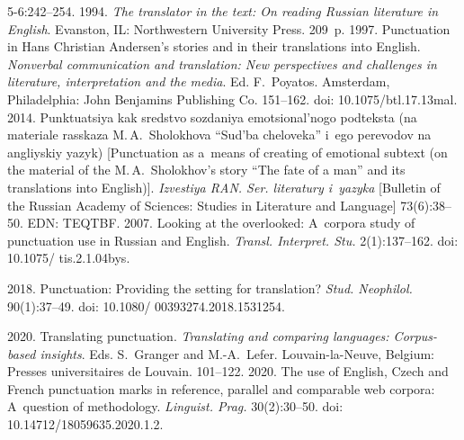 \begin{multicols}{2}
{{\begin{thebibliography}{99}
5-6:242--254.
 1994. \textit{The translator in the text: On reading Russian 
literature in English}. Evanston, IL: Northwestern University Press. 209~p.
 1997. Punctuation in Hans Christian Andersen's stories 
and in their translations into English. \textit{Nonverbal communication and 
translation: New perspectives and challenges in literature, interpretation and 
the media}. Ed. F.~Poyatos. Amsterdam, Philadelphia: John Benjamins Publishing 
Co. 151--162. doi: 10.1075/btl.17.13mal.
 2014. Punktuatsiya kak sredstvo so\-zda\-niya 
emotsional'nogo podteksta (na materiale rasskaza M.\,A.~Sho\-lo\-kho\-va 
``Sud'ba cheloveka'' i~ego perevodov na angliyskiy yazyk) [Punctuation as 
a~means of creating of emotional subtext (on the material of the 
M.\,A.~Sholokhov's story ``The fate of a man'' and its translations into 
English)]. \textit{Izvestiya RAN. Ser. literatury i~yazy\-ka} [Bulletin of the 
Russian Academy of Sciences: Studies in Literature and Language] 73(6):38--50. 
EDN: TEQTBF.
 2007. Looking at the overlooked: A~corpora study 
of punctuation use in Russian and English. \textit{Transl. Interpret. Stu.}  
2(1):137--162. doi: 10.1075/ tis.2.1.04bys.

 2018. Punctuation: Providing the setting for translation? 
\textit{Stud. Neophilol.} 90(1):37--49. doi: 10.1080/ 00393274.2018.1531254.

 2020. Translating punctuation. 
\textit{Translating and comparing languages: Corpus-based insights}. Eds. 
S.~Granger and M.-A.~Lefer. Louvain-la-Neuve, Belgium: Presses universitaires 
de Louvain. 101--122.
 2020. The 
use of English, Czech and French punctuation marks in reference, parallel and 
comparable web corpora: A~question of methodology. \textit{Linguist. Prag.} 
30(2):30--50. doi: 10.14712/18059635.2020.1.2.


\end{thebibliography}}}
\end{multicols}
